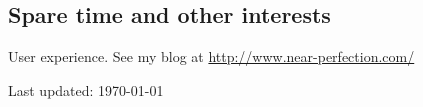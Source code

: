 \documentclass[letterpaper]{article}
\renewenvironment{itemize}{
  \begin{list}{}{
    \setlength{\leftmargin}{1.5em}
  }
}{
  \end{list}
}
\begin{document}
\subsection*{Spare time and other interests}
\begin{itemize}
\item User experience. See my blog at \url{http://www.near-perfection.com/}
\end{itemize}

\begin{center}
\begin{footnotesize}
Last updated: \today \\
\end{footnotesize}
\end{center}
\end{document}
